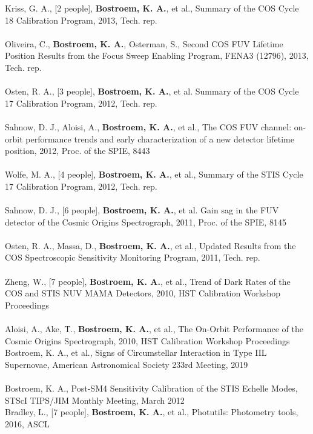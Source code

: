 \documentclass[10pt]{cv}
\begin{document}
\begin{llist}
Kriss, G. A., [2 people], \textbf{Bostroem, K. A.}, et al., Summary of the COS Cycle 18 Calibration Program, 2013, Tech. rep. \\ %
\\
Oliveira, C., \textbf{Bostroem, K. A.}, Osterman, S., Second COS FUV Lifetime Position Results from the Focus Sweep Enabling Program, FENA3 (12796), 2013, Tech. rep. \\ %
\\
Osten, R. A., [3 people], \textbf{Bostroem, K. A.}, et al. Summary of the COS Cycle 17 Calibration Program, 2012, Tech. rep. \\ %
\\
Sahnow, D. J., Aloisi, A., \textbf{Bostroem, K. A.}, et al., The COS FUV channel: on-orbit performance trends and early characterization of a new detector lifetime position, 2012, Proc. of the SPIE, 8443 \\
\\
Wolfe, M. A., [4 people], \textbf{Bostroem, K. A.}, et al., Summary of the STIS Cycle 17 Calibration Program, 2012, Tech. rep. \\%
\\
Sahnow, D. J., [6 people], \textbf{Bostroem, K. A.}, et al. Gain sag in the FUV detector of the Cosmic Origins Spectrograph, 2011,  Proc. of the SPIE, 8145 \\ %
\\
Osten, R. A., Massa, D., \textbf{Bostroem, K. A.}, et al., Updated Results from the COS Spectroscopic Sensitivity Monitoring Program, 2011, Tech. rep. \\ %
\\
Zheng, W., [7 people], \textbf{Bostroem, K. A.}, et al., Trend of Dark Rates of the COS and STIS NUV MAMA Detectors, 2010, HST Calibration Workshop Proceedings \\
\\
Aloisi, A., Ake, T., \textbf{Bostroem, K. A.}, et al., The On-Orbit Performance of the Cosmic Origins Spectrograph, 2010, HST Calibration Workshop Proceedings \\
\vspace{-0.1in}   
Bostroem, K. A., et al., Signs of Circumstellar Interaction in Type IIL Supernovae, American Astronomical Society 233rd Meeting,  2019\\
\\
Bostroem, K. A., Post-SM4 Sensitivity Calibration of the STIS Echelle Modes, STScI TIPS/JIM Monthly Meeting, March 2012 \\
\vspace{-0.1in}   
Bradley, L., [7 people], {\bf Bostroem,  K. A.}, et al., Photutils: Photometry tools, 2016, ASCL \\
%
\vspace{-0.1in}   


\end{llist}
\end{document}
